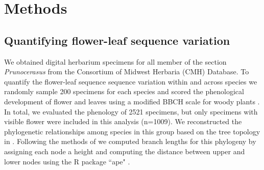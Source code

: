 \documentclass{article}[11pt]
\begin{document}
\section*{Methods}

\subsection{Quantifying flower-leaf sequence variation}
We obtained digital herbarium specimens for all member of the section \textit{Prunocerasus} from the Consortium of Midwest Herbaria (CMH) Database. To quantify the flower-leaf sequence sequence variation within and across species we randomly sample 200 specimens for each species and scored the phenological development of flower and leaves using a modified BBCH scale for woody plants \citep{Finn2007}. In total, we evaluated the phenology of 2521 specimens, but only specimens with visible flower were included in this analysis (n=1009). We reconstructed the phylogenetic relationships among species in this group based on the tree topology in \citet{Shaw:2004aa}. Following the methods of \citet{Granfen1989} we computed branch lengths for this phylogeny by assigning each node a height and computing the distance between upper and lower nodes using the R package ``ape" \citep{}.
\end{document}
